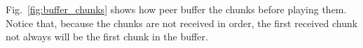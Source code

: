 \label{sec:buffer_chunks}

\begin{figure*}
   \caption{Buffering of the chunks.\label{fig:buffer_chunks}}
\end{figure*}

Fig.~\ref{fig:buffer_chunks} shows how peer buffer the chunks before
playing them. Notice that, because the chunks are not received in
order, the first received chunk not always will be the first chunk in
the buffer.
